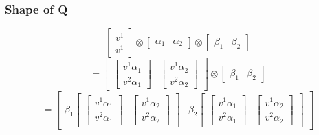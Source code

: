 \documentclass{report}
\begin{document}
\subsubsection{Shape of Q}
$$ \begin{bmatrix} v^1 \\ v^1 \end{bmatrix} \otimes \begin{bmatrix} \alpha_1 & \alpha_2 \end{bmatrix} \otimes \begin{bmatrix} \beta_1 & \beta_2 \end{bmatrix}  $$ 
$$ = \begin{bmatrix} \begin{bmatrix} v^1 \alpha_1 \\ v^2 \alpha_1  \end{bmatrix} & \begin{bmatrix} v^1\alpha_2 \\ v^2 \alpha_2 \end{bmatrix}  \end{bmatrix} \otimes \begin{bmatrix} \beta_1 & \beta_2 \end{bmatrix}   $$ 
$$ =\begin{bmatrix}  \beta_1 \begin{bmatrix} \begin{bmatrix} v^1 \alpha_1 \\ v^2 \alpha_1  \end{bmatrix} & \begin{bmatrix} v^1\alpha_2 \\ v^2 \alpha_2 \end{bmatrix}  \end{bmatrix} & \beta_2 \begin{bmatrix} \begin{bmatrix} v^1 \alpha_1 \\ v^2 \alpha_1  \end{bmatrix} & \begin{bmatrix} v^1\alpha_2 \\ v^2 \alpha_2 \end{bmatrix}  \end{bmatrix}  \end{bmatrix} $$ 
\end{document}
